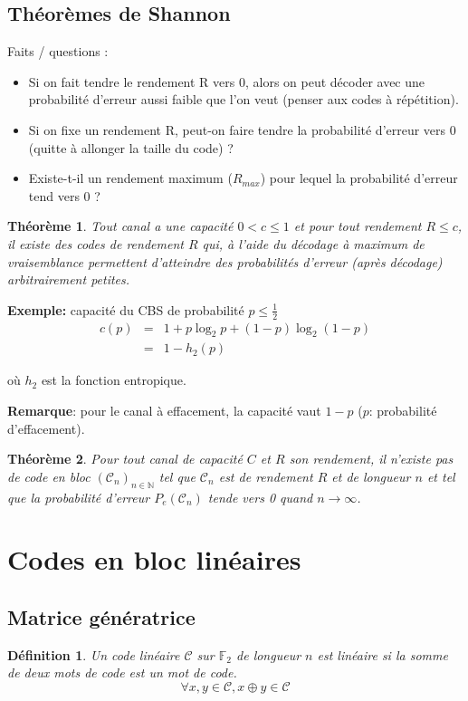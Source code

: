 \documentclass[a4paper,10pt,twocolumn]{article}
\theoremstyle{break}
\newtheorem{mydef}{Définition}
\newtheorem{myth}{Théorème}
\newenvironment{note}[1]
{\textbf{#1}:}
{}
\newenvironment{remarque}
{\begin{note}{Remarque}}
{\end{note}}
\begin{document}
\subsection{Théorèmes de Shannon}
Faits / questions :
\begin{itemize}
 \item Si on fait tendre le rendement R vers 0, alors on peut décoder avec une probabilité d'erreur aussi faible que l'on veut (penser aux codes à répétition).
 \item Si on fixe un rendement R, peut-on faire tendre la probabilité d'erreur vers 0 (quitte à allonger la taille du code) ?
 \item Existe-t-il un rendement maximum ($R_{max}$) pour lequel la probabilité d'erreur tend vers 0 ?
\end{itemize}

\begin{myth}
 Tout canal a une capacité $0 < c \le 1$ et pour tout rendement $R \le c$, il existe des codes de rendement $R$ qui, à l'aide du décodage à maximum de vraisemblance permettent d'atteindre des probabilités d'erreur (après décodage) arbitrairement petites.
\end{myth}

\textbf{Exemple:} capacité du CBS de probabilité $p \le \frac{1}{2}$
\begin{eqnarray*}
 c(p) & = & 1 + p \log_2 p + (1-p) \log_2 (1-p) \\
 & = & 1 - h_2(p)
\end{eqnarray*}

où $h_2$ est la fonction entropique.

\begin{remarque}
pour le canal à effacement, la capacité vaut $1-p$ ($p$: probabilité d'effacement). 
\end{remarque}

\begin{myth}
 Pour tout canal de capacité $C$ et $R$ son rendement, il n'existe pas de code en bloc $(\mathcal{C}_n)_{n \in \mathbb{N}}$ tel que $\mathcal{C}_n$ est de rendement $R$ et de longueur $n$ et tel que la probabilité d'erreur $P_e(\mathcal{C}_n)$ tende vers 0 quand $n \rightarrow \infty$.
\end{myth}

\section{Codes en bloc linéaires}
\subsection{Matrice génératrice}
\begin{mydef}
 Un code linéaire $\mathcal{C}$ sur $\mathbb{F}_2$ de longueur $n$ est linéaire si la somme de deux mots de code est un mot de code.
 $$ \forall x,y \in \mathcal{C}, x \oplus y \in \mathcal{C} $$
\end{mydef}
\end{document}
